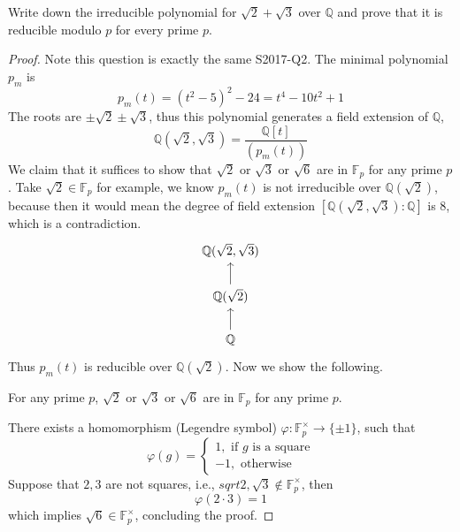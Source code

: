 \documentclass[openany]{book}
\newcommand{\F}{\mathbb{F}}
\newcommand{\Q}{\mathbb{Q}}
\begin{document}
\begin{prob}
    Write down the irreducible polynomial for \(\sqrt{2} + \sqrt{3}\) over \(\mathbb{Q}\) and prove that it is reducible modulo \(p\) for every prime \(p\).
\end{prob}
\begin{proof}
    Note this question is exactly the same S2017-Q2. The minimal polynomial $p_m$ is 
    \begin{equation*}
        p_m(t)=(t^2-5)^2-24=t^4-10t^2+1
    \end{equation*}
    The roots are $\pm\sqrt{2}\pm\sqrt{3}$, thus this polynomial generates a field extension of $\Q$, 
    \begin{equation*}
        \Q(\sqrt{2},\sqrt{3})=\frac{\Q[t]}{(p_m(t))}
    \end{equation*}
    We claim that it suffices to show that $\sqrt{2}$ or $\sqrt{3}$ or $\sqrt{6}$ are in $\F_p$ for any prime $p$. Take $\sqrt{2}\in\F_p$ for example, we know $p_m(t)$ is not irreducible over $\Q(\sqrt{2})$, because then it would mean the degree of field extension $[\Q(\sqrt{2},\sqrt{3}): \Q]$ is 8, which is a contradiction.
    \[\begin{tikzcd}
        {\mathbb{Q}(\sqrt{2},\sqrt{3})} \\
        {\mathbb{Q}(\sqrt{2})} \\
        {\mathbb{Q}}
        \arrow[from=2-1, to=1-1]
        \arrow[from=3-1, to=2-1]
    \end{tikzcd}\]
    Thus $p_m(t)$ is reducible over $\Q(\sqrt{2})$. Now we show the following.
    \begin{lem}
        For any prime $p$, $\sqrt{2}$ or $\sqrt{3}$ or $\sqrt{6}$ are in $\F_p$ for any prime $p$.
    \end{lem}
    There exists a homomorphism (Legendre symbol) $\varphi:\F_p^\times\to \{\pm 1\}$, such that 
    \begin{equation*}
        \varphi(g)=\begin{cases}
            1, \text{ if $g$ is a square}\\
            -1, \text{ otherwise}
        \end{cases}
    \end{equation*}
    Suppose that $2,3$ are not squares, i.e., $sqrt{2},\sqrt{3}\not\in\F_p^\times$, then 
    \begin{equation*}
        \varphi(2\cdot 3)=1
    \end{equation*}
    which implies $\sqrt{6}\in\F_p^\times$, concluding the proof.
\end{proof}
\end{document}
